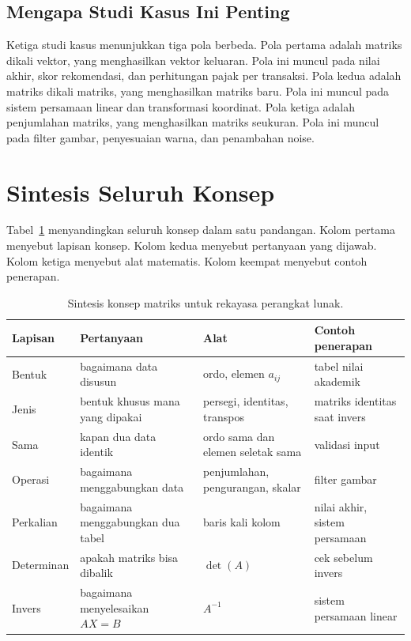 \documentclass[11pt,a4paper]{article}
\begin{document}
\subsection{Mengapa Studi Kasus Ini Penting}

Ketiga studi kasus menunjukkan tiga pola berbeda. Pola pertama adalah matriks dikali vektor, yang menghasilkan vektor keluaran. Pola ini muncul pada nilai akhir, skor rekomendasi, dan perhitungan pajak per transaksi. Pola kedua adalah matriks dikali matriks, yang menghasilkan matriks baru. Pola ini muncul pada sistem persamaan linear dan transformasi koordinat. Pola ketiga adalah penjumlahan matriks, yang menghasilkan matriks seukuran. Pola ini muncul pada filter gambar, penyesuaian warna, dan penambahan noise.

\section{Sintesis Seluruh Konsep}

Tabel~\ref{tab:sintesis} menyandingkan seluruh konsep dalam satu pandangan. Kolom pertama menyebut lapisan konsep. Kolom kedua menyebut pertanyaan yang dijawab. Kolom ketiga menyebut alat matematis. Kolom keempat menyebut contoh penerapan.

\begin{table}[H]
	\centering
	\caption{Sintesis konsep matriks untuk rekayasa perangkat lunak.}
	\label{tab:sintesis}
	\footnotesize
	\begin{tabularx}{\textwidth}{l X X X}
		\toprule
		Lapisan    & Pertanyaan                        & Alat                              & Contoh penerapan              \\
		\midrule
		Bentuk     & bagaimana data disusun            & ordo, elemen $a_{ij}$             & tabel nilai akademik          \\
		Jenis      & bentuk khusus mana yang dipakai   & persegi, identitas, transpos      & matriks identitas saat invers \\
		Sama       & kapan dua data identik            & ordo sama dan elemen seletak sama & validasi input                \\
		Operasi    & bagaimana menggabungkan data      & penjumlahan, pengurangan, skalar  & filter gambar                 \\
		Perkalian  & bagaimana menggabungkan dua tabel & baris kali kolom                  & nilai akhir, sistem persamaan \\
		Determinan & apakah matriks bisa dibalik       & $\det(A)$                         & cek sebelum invers            \\
		Invers     & bagaimana menyelesaikan $AX=B$    & $A^{-1}$                          & sistem persamaan linear       \\
		\bottomrule
	\end{tabularx}
\end{table}
\end{document}
